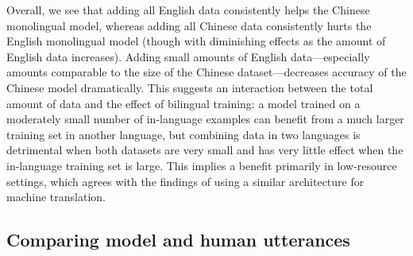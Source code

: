 \documentclass[11pt,a4paper]{article}
\renewcommand{\|}{\mid}
\begin{document}
Overall, we see that adding all English data consistently helps the Chinese monolingual model, whereas
adding all Chinese data consistently hurts the English monolingual model (though with diminishing effects
as the amount of English data increases). Adding small amounts of English data---especially amounts comparable
to the size of the Chinese dataset---decreases accuracy of the Chinese model dramatically. This suggests an
interaction between the total amount of data and the effect of bilingual training: a model trained on
a moderately small number of in-language examples can benefit from a much larger training set in another
language, but combining data in two languages is detrimental when both datasets are very small and has
very little effect when the in-language training set is large. This implies a benefit primarily in low-resource
settings, which agrees with the findings of \citet{Johnson2016} using a similar architecture for machine translation.

\subsection{Comparing model and human utterances}
\end{document}
